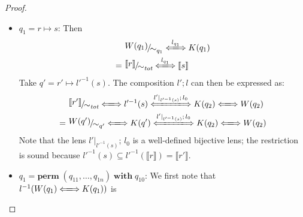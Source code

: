 \documentclass[a4paper,11pt] {article}
\theoremstyle{plain}
\newcommand{\lensbetween}[1]{\xLongleftrightarrow{#1}}
\newcommand{\perm}{ \textbf{perm}\; }
\newcommand{\with}{ \;\textbf{with}\; }
\newcommand{\niceFrac}[2]{%
    \raise.5ex\hbox{$#1$}%
    \kern-.1em/\kern-.15em%
    \lower.25ex\hbox{$#2$}}
\begin{document}
\begin{proof}
\begin{itemize}
  \item $q_1 = r \mapsto s$:
    Then 
    \begin{align*}
      &\niceFrac{W(q_1)}{\sim_{q_1}}
      \lensbetween{l_{q_1}} K(q_1) \\
      =~& \niceFrac{\llbracket r \rrbracket}{\sim_\textit{tot}}
      \lensbetween{l_{q_1}} \llbracket s \rrbracket \\
    \end{align*}
    Take $q' = r' \mapsto l'^{-1}(s)$.
    The composition $l'; l$ can then be expressed as:
    \begin{align*}
      &\niceFrac{\llbracket r' \rrbracket}{\sim_{\textit{tot}}}
        \lensbetween{}
        l'^{-1}(s) \lensbetween{l' |_{l'^{-1}(s)} ; \, l_0} K(q_2)
      \lensbetween{} W(q_2) \\
      =~&
      \niceFrac{W(q')}{\sim_{q'}} \lensbetween{}
      K(q') \lensbetween{l' |_{l'^{-1}(s)} ; \, l_0} K(q_2)
      \lensbetween{} W(q_2)
    \end{align*}
    Note that the lens $l' |_{l'^{-1}(s)}; \, l_0$ is a well-defined
    bijective lens; the restriction is sound because
    $l'^{-1}(s) \subseteq l'^{-1}(\llbracket r \rrbracket) =
    \llbracket r' \rrbracket$.
  \item $q_1 = \perm(q_{11}, \ldots, q_{1n}) \with q_{10}$:
    We first note that $l^{-1}(W(q_1) \lensbetween{} K(q_1))$ is 

    \begin{comment}
    Let $q' = \perm(l^{-1}(W(q_{11})), \ldots, l^{-1}(q_{1n})) \with l^{-1}(q_{10})$.
    \begin{align*}
      \llbracket r \rrbracket
      = W(\perm(l^{-1}(q_{11}), \ldots, l^{-1}(q_{1n})) \with l^{-1}(q_{10}))
    \end{align*}
    and 
    \end{comment}

  \end{itemize}
\end{proof}
\end{document}

